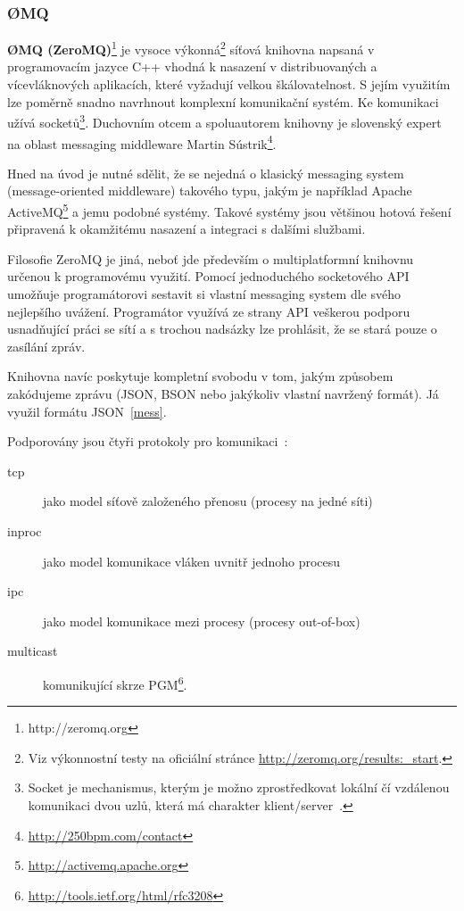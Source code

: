 \documentclass[thesis=M,czech]{FITthesis}[2014/05/07]
\begin{document}
\subsubsection{ØMQ}
\textbf{ØMQ (ZeroMQ)}\footnote{http://zeromq.org} je vysoce výkonná\footnote{Viz výkonnostní testy na oficiální stránce \url{http://zeromq.org/results:_start}.} síťová knihovna napsaná v programovacím jazyce C++ vhodná k nasazení v distribuovaných a vícevláknových aplikacích, které vyžadují velkou škálovatelnost. S jejím využitím lze poměrně snadno navrhnout komplexní komunikační systém. Ke komunikaci užívá socketů\footnote{Socket je mechanismus, kterým je možno zprostředkovat lokální čí vzdálenou komunikaci dvou uzlů, která má charakter klient/server~\cite{socket}.}. Duchovním otcem a spoluautorem knihovny je slovenský expert na oblast messaging middleware Martin Sústrik\footnote{\url{http://250bpm.com/contact}}.

Hned na úvod je nutné sdělit, že se nejedná o klasický messaging system (message-oriented middleware) takového typu, jakým je například Apache ActiveMQ\footnote{\url{http://activemq.apache.org}} a jemu podobné systémy. Takové systémy jsou většinou hotová řešení připravená k okamžitému nasazení a integraci s dalšími službami. 

Filosofie ZeroMQ je jiná, neboť jde především o multiplatformní knihovnu určenou k programovému využití. Pomocí jednoduchého socketového API umožňuje programátorovi sestavit si vlastní messaging system dle svého nejlepšího uvážení. Programátor využívá ze strany API veškerou podporu usnadňující práci se sítí a s trochou nadsázky lze prohlásit, že se stará pouze o zasílání zpráv.

Knihovna navíc poskytuje kompletní svobodu v tom, jakým způsobem zakódujeme zprávu (JSON, BSON nebo jakýkoliv vlastní navržený formát). Já využil formátu JSON~\ref{mess}.

Podporovány jsou čtyři protokoly pro komunikaci~\cite{zeromq1}:

\begin{description}
	\item[tcp] jako model síťově založeného přenosu (procesy na jedné síti)
	\item[inproc] jako model komunikace vláken uvnitř jednoho procesu
	\item[ipc] jako model komunikace mezi procesy (procesy out-of-box)
	\item[multicast]	komunikující skrze PGM\footnote{\url{http://tools.ietf.org/html/rfc3208}}.
\end{description}
\end{document}
